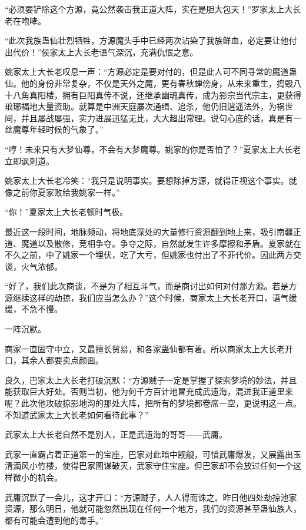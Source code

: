 
\begin{this_body}



“必须要铲除这个方源，竟公然袭击我正道大阵，实在是胆大包天！”罗家太上大长老在咆哮。

“此次我族蛊仙壮烈牺牲，方源魔头手中已经两次沾染了我族鲜血，必定要让他付出代价！”侯家太上大长老语气深沉，充满仇恨之意。

姚家太上大长老叹息一声：“方源必定是要对付的，但是此人可不同寻常的魔道蛊仙。他的身份非常复杂，不仅是天外之魔，更有春秋蝉傍身，从未来重生，捣毁八十八角真阳楼，拥有巨阳真传不说，还继承幽魂真传，成为影宗当代宗主，更获得琅琊福地大量资助。就算是中洲天庭屡次通缉、追杀，他仍旧逍遥法外，为祸世间，并且屡战屡强，实力进展迅猛无比，大大超出常理。说句心底的话，真是有一丝魔尊年轻时候的气象了。”

“哼！未来只有大梦仙尊，不会有大梦魔尊。姚家的你是否怕了？”夏家太上大长老立即讽刺道。

姚家太上大长老冷笑：“我只是说明事实。要想除掉方源，就得正视这个事实。就像之前你夏家败给我姚家一样。”

“你！”夏家太上大长老顿时气极。

最近这一段时间，地脉频动，将地底深处的大量修行资源翻到地上来，吸引南疆正道、魔道以及散修，竞相争夺。争夺之际，自然就发生许多摩擦和矛盾。夏家就在不久之前，中了姚家一个埋伏，吃了大亏，但姚家也付出了不菲代价。因此两方交谈，火气浓郁。

“好了，我们此次商谈，不是为了相互斗气，而是商讨出如何对付那方源。若是方源继续这样的劫掠，我们应当怎么办？”这个时候，商家太上大长老开口，语气缓缓，不急不慢。

一阵沉默。

商家一直固守中立，又最擅长贸易，和各家蛊仙都有着。所以商家太上大长老开口，其余人都要卖点颜面。

良久，巴家太上大长老打破沉默：“方源贼子一定是掌握了探索梦境的妙法，并且能获取巨大好处。否则当初，他为何千方百计地冒充成武遗海，混进我正道里来呢？此次他攻破掠影地沟的那处大阵，把所有的梦境都卷席一空，更说明这一点。不知道武家太上大长老如何看待此事？”

武家太上大长老自然不是别人，正是武遗海的哥哥——武庸。

武家一直霸占着正道第一的宝座，巴家对此暗中觊觎，可惜武庸爆发，又展露出玉清滴风小竹楼，使得巴家图谋破灭，武家守住宝座。但巴家却不会放过任何一个这样微小的机会。

武庸沉默了一会儿，这才开口：“方源贼子，人人得而诛之。昨日他四处劫掠池家资源，那么明日，他就可能忽然出现在任何一个地方，我们的资源甚至蛊仙族人，都有可能会遭到他的毒手。”


\end{this_body}
